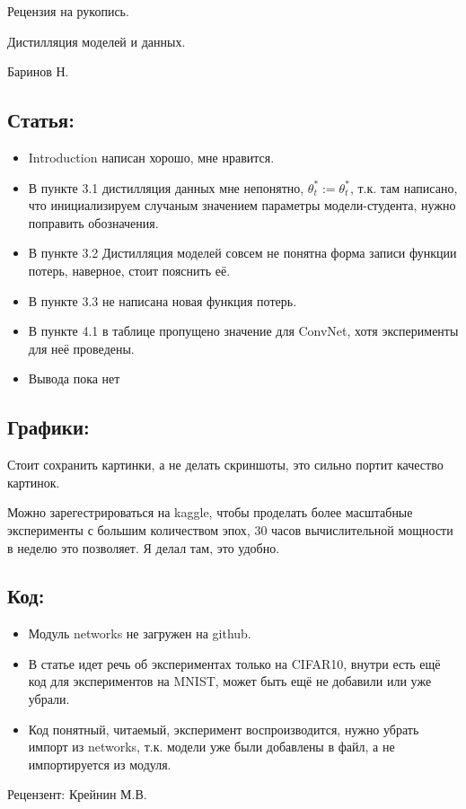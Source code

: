 \documentclass[17pt]{ article}
\begin{document}
\begin{center}
    Рецензия на рукопись.

    Дистилляция моделей и данных. 

    Баринов Н.
\end{center}

\subsection*{Статья:}
\begin{itemize}

\item Introduction написан хорошо, мне нравится. 

\item В пункте 3.1 дистилляция данных мне непонятно, $\theta_t^* := \theta_t^*$, т.к. там написано, что инициализируем случаным значением параметры модели-студента, нужно поправить обозначения.

\item В пункте 3.2 Дистилляция моделей совсем не понятна форма записи функции потерь, наверное, стоит пояснить её.

\item В пункте 3.3 не написана новая функция потерь. 

\item В пункте 4.1 в таблице пропущено значение для ConvNet, хотя эксперименты для неё проведены.

\item Вывода пока нет

\end{itemize}

\subsection*{Графики:}
Стоит сохранить картинки, а не делать скриншоты, это сильно портит качество картинок.

Можно зарегестрироваться на kaggle, чтобы проделать более масштабные эксперименты с большим количеством эпох, 30 часов вычислительной мощности в неделю это позволяет. Я делал там, это удобно.

\subsection*{Код:}
\begin{itemize}
    \item Модуль networks не загружен на github.
    \item В статье идет речь об экспериментах только на CIFAR10, внутри есть ещё код для экспериментов на MNIST, может быть ещё не добавили или уже убрали.
    \item Код понятный, читаемый, эксперимент воспроизводится, нужно убрать импорт из networks, т.к. модели уже были добавлены в файл, а не импортируется из модуля.
\end{itemize}

Рецензент:
\newline Крейнин М.В.
\end{document}

